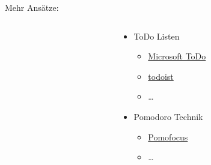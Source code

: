 \begin{frame}{Mehr Ansätze:}
\begin{columns}[t]
\begin{column}{0.3\textwidth}
        \end{column}
        \begin{column}{0.7\textwidth}
            \begin{itemize}
                \item ToDo Listen
                \begin{itemize}
                    \item \href{https://to-do.office.com/tasks/}{Microsoft ToDo}
                    \item \href{https://todoist.com/de}{todoist}
                    \item \dots
                \end{itemize}
                \item Pomodoro Technik
                \begin{itemize}
                    \item \href{https://pomofocus.io/}{Pomofocus}
                    \item \dots
                \end{itemize}                 
            \end{itemize}
        \end{column}
    \end{columns}
\end{frame}


